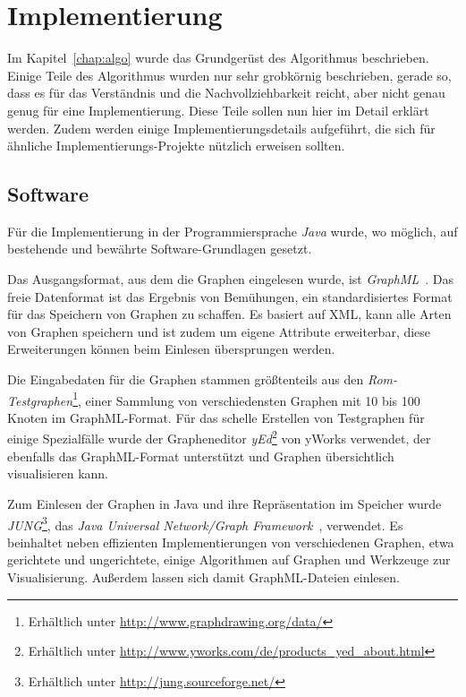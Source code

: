 \documentclass[a4paper]{scrreprt}
\theoremstyle{definition}
\begin{document}
\chapter{Implementierung}
\label{chap:impl}

Im Kapitel~\ref{chap:algo} wurde das Grundgerüst des Algorithmus beschrieben. Einige Teile des Algorithmus wurden nur sehr grobkörnig beschrieben, gerade so, dass es für das Verständnis und die Nachvollziehbarkeit reicht, aber nicht genau genug für eine Implementierung. Diese Teile sollen nun hier im Detail erklärt werden. Zudem werden einige Implementierungsdetails aufgeführt, die sich für ähnliche Implementierungs-Projekte nützlich erweisen sollten.

\section{Software}

Für die Implementierung in der Programmiersprache \emph{Java} wurde, wo möglich, auf bestehende und bewährte Software-Grundlagen gesetzt.

Das Ausgangsformat, aus dem die Graphen eingelesen wurde, ist \emph{GraphML}~\cite{brandes+al-14}. Das freie Datenformat ist das Ergebnis von Bemühungen, ein standardisiertes Format für das Speichern von Graphen zu schaffen. Es basiert auf XML, kann alle Arten von Graphen speichern und ist zudem um eigene Attribute erweiterbar, diese Erweiterungen können beim Einlesen übersprungen werden.

Die Eingabedaten für die Graphen stammen größtenteils aus den \emph{Rom-Testgraphen}\footnote{Erhältlich unter \url{http://www.graphdrawing.org/data/}}, einer Sammlung von verschiedensten Graphen mit 10 bis 100 Knoten im GraphML-Format. Für das schelle Erstellen von Testgraphen für einige Spezialfälle wurde der Grapheneditor \emph{yEd}\footnote{Erhältlich unter \url{http://www.yworks.com/de/products_yed_about.html}} von yWorks verwendet, der ebenfalls das GraphML-Format unterstützt und Graphen übersichtlich visualisieren kann.

Zum Einlesen der Graphen in Java und ihre Repräsentation im Speicher wurde \emph{JUNG}\footnote{Erhältlich unter \url{http://jung.sourceforge.net/}}, das \emph{Java Universal Network/Graph Framework}~\cite{jung}, verwendet. Es beinhaltet neben effizienten Implementierungen von verschiedenen Graphen, etwa gerichtete und ungerichtete, einige Algorithmen auf Graphen und Werkzeuge zur Visualisierung. Außerdem lassen sich damit GraphML-Dateien einlesen.
\end{document}
